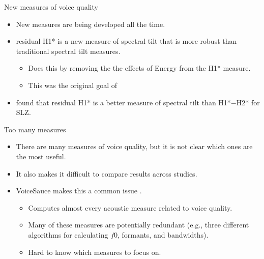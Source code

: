 \documentclass[professionalfonts]{beamer}
\begin{document}
\begin{frame}{New measures of voice quality}
  \begin{itemize}
    \item New measures are being developed all the time.
    \item {} residual H1* is a new measure of spectral tilt that is more robust than traditional spectral tilt measures.
    \begin{itemize}
      \item Does this by removing the the effects of Energy from the H1* measure.
      \item This was the original goal of \citet{fischer-jorgensenPhoneticAnalysisBreathy1968}
    \end{itemize}
    \item \citet{brinkerhoffUsingResidualH12025} found that residual H1* is a better measure of spectral tilt than H1*$-$H2* for SLZ.
  \end{itemize}
\end{frame}

\begin{frame}{Too many measures}
  \begin{itemize}
    \item There are many measures of voice quality, but it is not clear which ones are the most useful.
    \item It also makes it difficult to compare results across studies.
    \item VoiceSauce makes this a common issue \citep{shueVoiceSauceProgramVoice2011}.
    \begin{itemize}
      \item Computes almost every acoustic measure related to voice quality.
      \item Many of these measures are potentially redundant (e.g., three different algorithms for calculating $f0$, formants, and bandwidths). 
      \item Hard to know which measures to focus on.
    \end{itemize}
  \end{itemize}
\end{frame}
\end{document}
